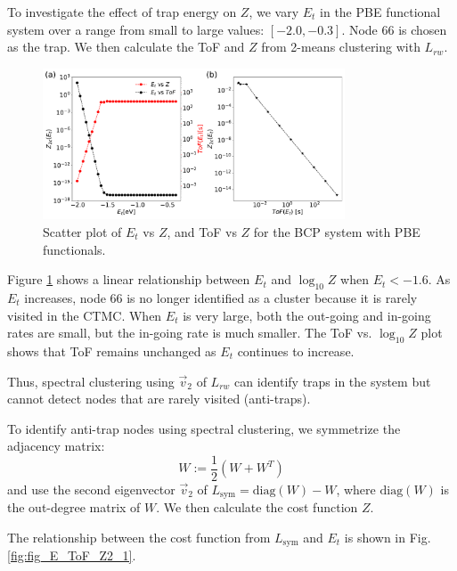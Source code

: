 \documentclass[letterpaper,12pt]{article}
\begin{document}
To investigate the effect of trap energy on $Z$, we vary $E_t$ in the PBE functional system over a range from small to large values: $[-2.0, -0.3]$. Node 66 is chosen as the trap. We then calculate the ToF and $Z$ from 2-means clustering with $L_{rw}$.

\begin{figure}
    \centering
    \includegraphics[width=0.8\textwidth]{figs/fig_E_ToF_Z_nonsym.pdf}
    \caption{Scatter plot of $E_t$ vs $Z$, and ToF vs $Z$ for the BCP system with PBE functionals.}
    \label{fig:fig_E_ToF_Z2_Lrw}
\end{figure}

Figure \ref{fig:fig_E_ToF_Z2_Lrw} shows a linear relationship between $E_t$ and $\log_{10} Z$ when $E_t < -1.6$. As $E_t$ increases, node 66 is no longer identified as a cluster because it is rarely visited in the CTMC. When $E_t$ is very large, both the out-going and in-going rates are small, but the in-going rate is much smaller. The ToF vs. $\log_{10} Z$ plot shows that ToF remains unchanged as $E_t$ continues to increase.

Thus, spectral clustering using $\vec{v}_2$ of $L_{rw}$ can identify traps in the system but cannot detect nodes that are rarely visited (anti-traps).



To identify anti-trap nodes using spectral clustering, we symmetrize the adjacency matrix:
\begin{equation}
    W := \frac{1}{2}(W + W^T)
\end{equation}
and use the second eigenvector $\vec{v}_2$ of $L_\text{sym} = \text{diag}(W) - W$, where $\text{diag}(W)$ is the out-degree matrix of $W$. We then calculate the cost function $Z$.

The relationship between the cost function from $L_\text{sym}$ and $E_t$ is shown in Fig.\ref{fig:fig_E_ToF_Z2_1}.
\end{document}
